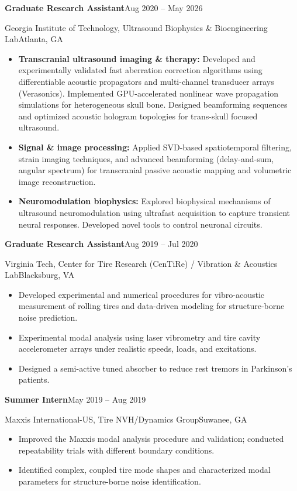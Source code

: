 \documentclass[10pt,letterpaper]{article}
\newcommand{\entry}[4]{%
  {\textbf{\color{navy}#1}\hfill{\color{muted}\small #2}\par}%
  {{\color{accent}#3}\hfill{\color{muted}\small #4}\par}\vspace{2pt}}
\newcommand{\gap}{\vspace{7pt}}
\begin{document}
\entry{Graduate Research Assistant}{Aug 2020 -- May 2026}{Georgia Institute of Technology, Ultrasound Biophysics \& Bioengineering Lab}{Atlanta, GA}
\begin{itemize}
  \item \textbf{Transcranial ultrasound imaging \& therapy:} Developed and experimentally validated fast aberration correction algorithms using differentiable acoustic propagators and multi-channel transducer arrays (Verasonics). Implemented GPU-accelerated nonlinear wave propagation simulations for heterogeneous skull bone. Designed beamforming sequences and optimized acoustic hologram topologies for trans-skull focused ultrasound.
  \item \textbf{Signal \& image processing:} Applied SVD-based spatiotemporal filtering, strain imaging techniques, and advanced beamforming (delay-and-sum, angular spectrum) for transcranial passive acoustic mapping and volumetric image reconstruction.
  \item \textbf{Neuromodulation biophysics:} Explored biophysical mechanisms of ultrasound neuromodulation using ultrafast acquisition to capture transient neural responses. Developed novel tools to control neuronal circuits.
\end{itemize}
\gap

\entry{Graduate Research Assistant}{Aug 2019 -- Jul 2020}{Virginia Tech, Center for Tire Research (CenTiRe) / Vibration \& Acoustics Lab}{Blacksburg, VA}
\begin{itemize}
  \item Developed experimental and numerical procedures for vibro-acoustic measurement of rolling tires and data-driven modeling for structure-borne noise prediction.
  \item Experimental modal analysis using laser vibrometry and tire cavity accelerometer arrays under realistic speeds, loads, and excitations.
  \item Designed a semi-active tuned absorber to reduce rest tremors in Parkinson's patients.
\end{itemize}
\gap

\entry{Summer Intern}{May 2019 -- Aug 2019}{Maxxis International-US, Tire NVH/Dynamics Group}{Suwanee, GA}
\begin{itemize}
  \item Improved the Maxxis modal analysis procedure and validation; conducted repeatability trials with different boundary conditions.
  \item Identified complex, coupled tire mode shapes and characterized modal parameters for structure-borne noise identification.
\end{itemize}
\gap
\end{document}

